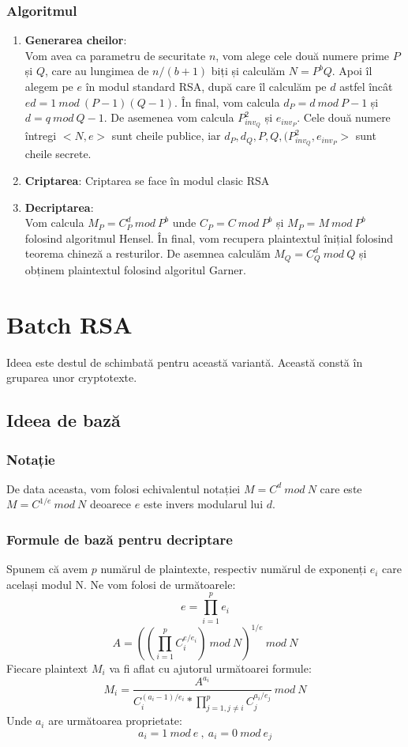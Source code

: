 \documentclass[12]{report}
\begin{document}
		  \subsubsection{Algoritmul}
		  \begin{enumerate}
		  \item \textbf{Generarea cheilor}:\\
		  Vom avea ca parametru de securitate $n$, vom alege cele două numere prime $P$ și $Q$, care au lungimea de $n/(b+1)$ biți și calculăm $N=P^bQ$. Apoi îl alegem pe $e$ în modul standard RSA, după care îl calculăm pe $d$ astfel încât $ed=1 \ mod \ (P-1)(Q-1)$. În final, vom calcula $d_P= d \ mod \ P-1$ și $d=q \ mod \ Q-1$. De asemenea vom calcula $P_{inv_Q}^{2}$ și $e_{inv_P}$. Cele două numere întregi $<N,e>$ sunt cheile publice, iar $d_P,d_Q,P,Q,(P_{inv_Q}^{2},e_{inv_P}>$ sunt cheile secrete.
		  \item \textbf{Criptarea}:
		  Criptarea se face în modul clasic RSA
		  
		  \item \textbf{Decriptarea}: \\
		  Vom calcula $M_P = C_{P}^{d} \ mod \ P^b $ unde $C_P = C \ mod \ P^b$ și  $M_P = M \ mod \ P^b$ folosind algoritmul Hensel. În final, vom recupera plaintextul înițial folosind teorema chineză a resturilor. De asemnea calculăm $M_Q= C_{Q}^{d} \ mod \ Q$ și obținem plaintextul folosind algoritul Garner.
		  \end{enumerate}
		  
		  \section{Batch RSA}
		  Ideea este destul de schimbată pentru această variantă. Această constă în gruparea unor cryptotexte.
		  \subsection{Ideea de bază}
		  \subsubsection{Notație}
		  De data aceasta, vom folosi echivalentul notației $M=C^d \ mod \ N$ care este $M=C^{1/e} \ mod \ N$ deoarece $e$ este invers modularul lui $d$.
		  
		  \subsubsection{Formule de bază pentru decriptare}
		  Spunem că avem $p$ numărul de plaintexte, respectiv numărul de exponenți $e_i$ care același modul N. Ne vom folosi de următoarele:
		  $$ e= \prod_{i=1}^{p}e_i$$
		  $$ A =\left( \left(\prod_{i=1}^{p} C_{i}^{e/e_i} \right) \ mod \ N \right)^{1/e} \ mod \ N$$
		  Fiecare plaintext $M_i$ va fi aflat cu ajutorul următoarei formule:
		  $$ M_i = \frac{A^{a_i}}{C_{i}^{(a_i-1)/e_i} * \prod_{j=1,j \neq i }^{p } C_{j}^{a_i/e_j }                                 } \ mod \ N$$ 	
		  Unde $a_i$ are următoarea proprietate:
		  $$a_i = 1 \ mod \ e \ , \ a_i=0 \ mod \ e_j$$	  
		  
\end{document}

